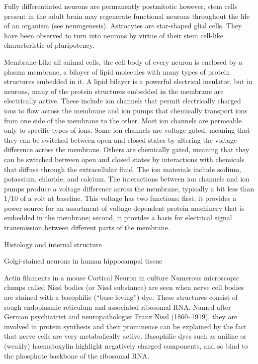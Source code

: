 Fully differentiated neurons are permanently postmitotic however, stem cells present in the adult brain may regenerate functional neurons throughout the life of an organism (see neurogenesis). Astrocytes are star-shaped glial cells. They have been observed to turn into neurons by virtue of their stem cell-like characteristic of pluripotency.

Membrane
Like all animal cells, the cell body of every neuron is enclosed by a plasma membrane, a bilayer of lipid molecules with many types of protein structures embedded in it. A lipid bilayer is a powerful electrical insulator, but in neurons, many of the protein structures embedded in the membrane are electrically active. These include ion channels that permit electrically charged ions to flow across the membrane and ion pumps that chemically transport ions from one side of the membrane to the other. Most ion channels are permeable only to specific types of ions. Some ion channels are voltage gated, meaning that they can be switched between open and closed states by altering the voltage difference across the membrane. Others are chemically gated, meaning that they can be switched between open and closed states by interactions with chemicals that diffuse through the extracellular fluid. The ion materials include sodium, potassium, chloride, and calcium. The interactions between ion channels and ion pumps produce a voltage difference across the membrane, typically a bit less than 1/10 of a volt at baseline. This voltage has two functions: first, it provides a power source for an assortment of voltage-dependent protein machinery that is embedded in the membrane; second, it provides a basis for electrical signal transmission between different parts of the membrane.

Histology and internal structure

Golgi-stained neurons in human hippocampal tissue

Actin filaments in a mouse Cortical Neuron in culture
Numerous microscopic clumps called Nissl bodies (or Nissl substance) are seen when nerve cell bodies are stained with a basophilic (``base-loving'') dye. These structures consist of rough endoplasmic reticulum and associated ribosomal RNA. Named after German psychiatrist and neuropathologist Franz Nissl (1860--1919), they are involved in protein synthesis and their prominence can be explained by the fact that nerve cells are very metabolically active. Basophilic dyes such as aniline or (weakly) haematoxylin highlight negatively charged components, and so bind to the phosphate backbone of the ribosomal RNA.

